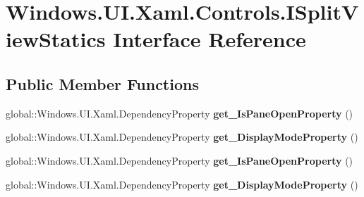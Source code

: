 \hypertarget{interface_windows_1_1_u_i_1_1_xaml_1_1_controls_1_1_i_split_view_statics}{}\section{Windows.\+U\+I.\+Xaml.\+Controls.\+I\+Split\+View\+Statics Interface Reference}
\label{interface_windows_1_1_u_i_1_1_xaml_1_1_controls_1_1_i_split_view_statics}
\subsection*{Public Member Functions}
\begin{DoxyCompactItemize}
\item 
\mbox{\label{interface_windows_1_1_u_i_1_1_xaml_1_1_controls_1_1_i_split_view_statics_a159de52c3745095518a1e59fe0fde68f}} 
global\+::\+Windows.\+U\+I.\+Xaml.\+Dependency\+Property {\bfseries get\+\_\+\+Is\+Pane\+Open\+Property} ()
\item 
\mbox{\label{interface_windows_1_1_u_i_1_1_xaml_1_1_controls_1_1_i_split_view_statics_a3f596e3498f63a30c52b09132463c084}} 
global\+::\+Windows.\+U\+I.\+Xaml.\+Dependency\+Property {\bfseries get\+\_\+\+Display\+Mode\+Property} ()
\item 
\mbox{\label{interface_windows_1_1_u_i_1_1_xaml_1_1_controls_1_1_i_split_view_statics_a159de52c3745095518a1e59fe0fde68f}} 
global\+::\+Windows.\+U\+I.\+Xaml.\+Dependency\+Property {\bfseries get\+\_\+\+Is\+Pane\+Open\+Property} ()
\item 
\mbox{\label{interface_windows_1_1_u_i_1_1_xaml_1_1_controls_1_1_i_split_view_statics_a3f596e3498f63a30c52b09132463c084}} 
global\+::\+Windows.\+U\+I.\+Xaml.\+Dependency\+Property {\bfseries get\+\_\+\+Display\+Mode\+Property} ()
\item 
\mbox{\label{interface_windows_1_1_u_i_1_1_xaml_1_1_controls_1_1_i_split_view_statics_a159de52c3745095518a1e59fe0fde68f}} 

\end{DoxyCompactItemize}
